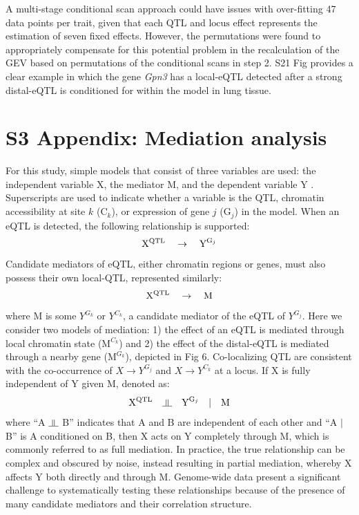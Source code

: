 \documentclass[10pt,letterpaper,twoside]{article}
\newcommand{\indep}{\rotatebox[origin=c]{90}{$\models$}}
\begin{document}
A multi-stage conditional scan approach could have issues with over-fitting 47 data points per trait, given that each $\text{QTL}$ and $\text{locus}$ effect represents the estimation of seven fixed effects. However, the permutations were found to appropriately compensate for this potential problem in the recalculation of the GEV based on permutations of the conditional scans in step 2. S21 Fig provides a clear example in which the gene \textit{Gpn3} has a local-eQTL detected after a strong distal-eQTL is conditioned for within the model in lung tissue. 

\newpage

\section*{S3 Appendix: Mediation analysis}

For this study, simple models that consist of three variables are used: the independent variable X, the mediator M, and the dependent variable Y \cite{Baron1986,MacKinnon2007}. Superscripts are used to indicate whether a variable is the QTL, chromatin accessibility at site $k$ ($\text{C}_{k}$), or expression of gene $j$ ($\text{G}_{j}$) in the model. When an eQTL is detected, the following relationship is supported:
\begin{equation}
\text{X}\textsuperscript{QTL} \quad \rightarrow \quad \text{Y}^{\text{G}_{j}}
\label{rel:eQTL}
\end{equation}
Candidate mediators of eQTL, either chromatin regions or genes, must also possess their own local-QTL, represented similarly:
\begin{equation}
\text{X}\textsuperscript{QTL} \quad \rightarrow \quad \text{M}
\label{rel:cQTL}
\end{equation}
where M is some $Y^{G_{k}}$ or $Y^{C_{k}}$, a candidate mediator of the eQTL of $Y^{G_{j}}$. 
Here we consider two models of mediation: 1) the effect of an eQTL is mediated through local chromatin state ($\text{M}^{C_{k}}$) and 2) the effect of the distal-eQTL is mediated through a nearby gene ($\text{M}^{G_{k}}$), depicted in Fig 6. Co-localizing QTL are consistent with the co-occurrence of $X \rightarrow Y^{G_{j}}$ and $X \rightarrow Y^{C_{k}}$ at a locus. If X is fully independent of Y given M, denoted as: 
\begin{equation}
\text{X}\textsuperscript{QTL} \quad \indep \quad \text{Y}^{\text{G}_{j}} \quad | \quad \text{M}
\label{rel:full_mediator}
\end{equation}
where ``A $\indep$ B'' indicates that A and B are independent of each other and ``A $|$ B'' is A conditioned on B, then X acts on Y completely through M, which is commonly referred to as full mediation. In practice, the true relationship can be complex and obscured by noise, instead resulting in partial mediation, whereby X affects Y both directly and through M. Genome-wide data present a significant challenge to systematically testing these relationships because of the presence of many candidate mediators and their correlation structure.
\end{document}
